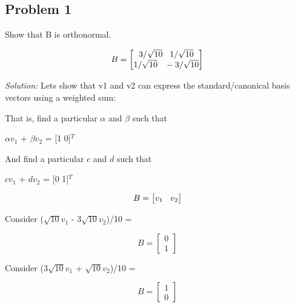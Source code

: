 \documentclass[11pt]{article}
\begin{document}
\subsection*{Problem 1}
Show that B is orthonormal.

\begin{center}
\[
B = 
\begin{bmatrix}
   3/\sqrt{10} \hspace{3mm}   1/\sqrt{10} \\
   1/\sqrt{10} \hspace{3mm}   -3/\sqrt{10}           
\end{bmatrix}
\]
\end{center}

\vspace{4mm}
\emph{Solution:}
Lets show that v1 and v2 can express the standard/canonical basis vectors using a weighted sum:

\vspace{5mm}
That is, find a particular  $\alpha$ and $\beta$ such that
\begin{center}
 $\alpha$$v_1$ + $\beta$$v_2$ = [1 0]$^{T}$
\end{center}
And find a particular  $c$ and $d$ such that
\begin{center}
 $c$$v_1$ + $d$$v_2$ = [0 1]$^{T}$
\end{center}
\begin{center}
\[
B = 
\begin{bmatrix}
   v_1  \hspace{3mm}  v_2 
\end{bmatrix}
\]
\end{center}

\vspace{4mm}

Consider ($\sqrt{10}v_1$ - 3$\sqrt{10}v_2$)/10 =


\begin{center}
\[
B = 
\begin{bmatrix}
   0 \\
 1
\end{bmatrix}
\]
\end{center}


\vspace{4mm}

Consider (3$\sqrt{10}v_1$ + $\sqrt{10}v_2$)/10 =

\begin{center}
\[
B = 
\begin{bmatrix}
   1 \\
 0
\end{bmatrix}
\]
\end{center}
\end{document}
